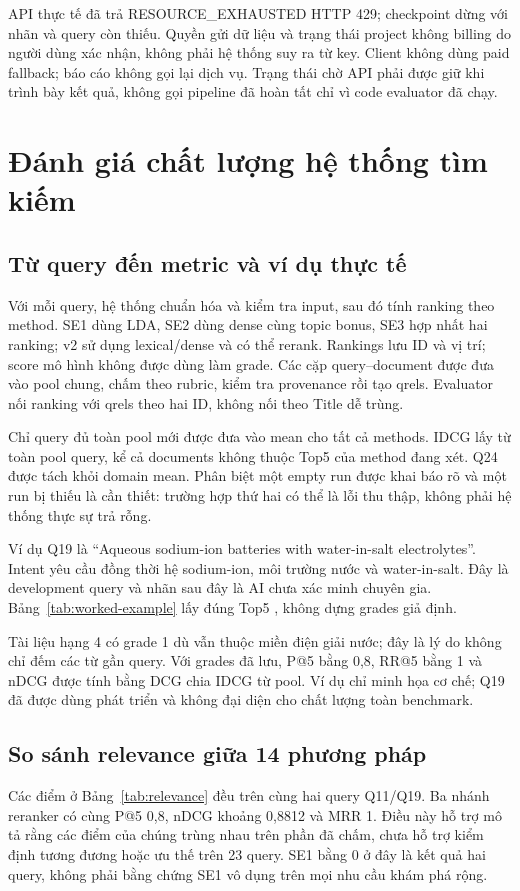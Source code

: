API thực tế đã trả RESOURCE\_EXHAUSTED HTTP 429; checkpoint dừng với nhãn và query còn thiếu. Quyền gửi dữ liệu và trạng thái project không billing do người dùng xác nhận, không phải hệ thống suy ra từ key. Client không dùng paid fallback; báo cáo không gọi lại dịch vụ. Trạng thái chờ API phải được giữ khi trình bày kết quả, không gọi pipeline đã hoàn tất chỉ vì code evaluator đã chạy.

\section{Đánh giá chất lượng hệ thống tìm kiếm}
\subsection{Từ query đến metric và ví dụ thực tế}
Với mỗi query, hệ thống chuẩn hóa và kiểm tra input, sau đó tính ranking theo method. SE1 dùng LDA, SE2 dùng dense cùng topic bonus, SE3 hợp nhất hai ranking; v2 sử dụng lexical/dense và có thể rerank. Rankings lưu ID và vị trí; score mô hình không được dùng làm grade. Các cặp query--document được đưa vào pool chung, chấm theo rubric, kiểm tra provenance rồi tạo qrels. Evaluator nối ranking với qrels theo hai ID, không nối theo Title dễ trùng.

Chỉ query đủ toàn pool mới được đưa vào mean cho tất cả methods. IDCG lấy từ toàn pool query, kể cả documents không thuộc Top5 của method đang xét. Q24 được tách khỏi domain mean. Phân biệt một empty run được khai báo rõ và một run bị thiếu là cần thiết: trường hợp thứ hai có thể là lỗi thu thập, không phải hệ thống thực sự trả rỗng.

Ví dụ Q19 là ``Aqueous sodium-ion batteries with water-in-salt electrolytes''. Intent yêu cầu đồng thời hệ sodium-ion, môi trường nước và water-in-salt. Đây là development query và nhãn sau đây là AI chưa xác minh chuyên gia. Bảng~\ref{tab:worked-example} lấy đúng Top5 , không dựng grades giả định.


Tài liệu hạng 4 có grade 1 dù vẫn thuộc miền điện giải nước; đây là lý do không chỉ đếm các từ gần query. Với grades đã lưu, P@5 bằng 0,8, RR@5 bằng 1 và nDCG được tính bằng DCG chia IDCG từ pool. Ví dụ chỉ minh họa cơ chế; Q19 đã được dùng phát triển và không đại diện cho chất lượng toàn benchmark.

\subsection{So sánh relevance giữa 14 phương pháp}

Các điểm ở Bảng~\ref{tab:relevance} đều trên cùng hai query Q11/Q19. Ba nhánh reranker có cùng P@5 0,8, nDCG khoảng 0,8812 và MRR 1. Điều này hỗ trợ mô tả rằng các điểm của chúng trùng nhau trên phần đã chấm, chưa hỗ trợ kiểm định tương đương hoặc ưu thế trên 23 query. SE1 bằng 0 ở đây là kết quả hai query, không phải bằng chứng SE1 vô dụng trên mọi nhu cầu khám phá rộng.

